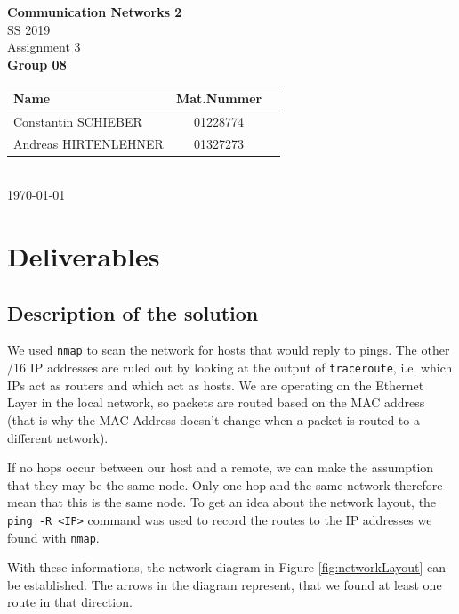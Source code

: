 \documentclass[parskip=full]{scrartcl}
\begin{document}
\begin{titlepage}
    \centering
    \vspace*{2cm}
    {\Huge \textbf{Communication Networks 2}}\\
    SS 2019\\
    \vspace*{1cm}
    {\Large Assignment 3}
    \\\vspace*{3cm}
    {\Large \textbf{Group 08}}\\
    \vspace*{1cm}
    {\large 
        \begin{tabular}{l c c}
            Name & Mat.Nummer \\ \hline
            Constantin SCHIEBER & 01228774 \\
            Andreas HIRTENLEHNER & 01327273
        \end{tabular}
    }
    \\\vspace*{7cm}
    \today
\end{titlepage}

\section{Deliverables}

\subsection{Description of the solution}
We used \texttt{nmap} to scan the network for hosts that would reply to pings. 
The other /16 IP addresses are ruled out by looking at the output of \texttt{traceroute}, i.e. which IPs act as routers and which act as hosts.
We are operating on the Ethernet Layer in the local network, so packets are routed based on the MAC address (that is why the MAC Address doesn't change when a packet is routed to a different network).

If no hops occur between our host and a remote, we can make the assumption that they may be the same node.
Only one hop and the same network therefore mean that this is the same node.
To get an idea about the network layout, the \texttt{ping -R <IP>} command was used to record the routes to the IP addresses we found with \texttt{nmap}.

With these informations, the network diagram in Figure \ref{fig:networkLayout} can be established. The arrows in the diagram represent, that we found at least one route in that direction. 
\end{document}

